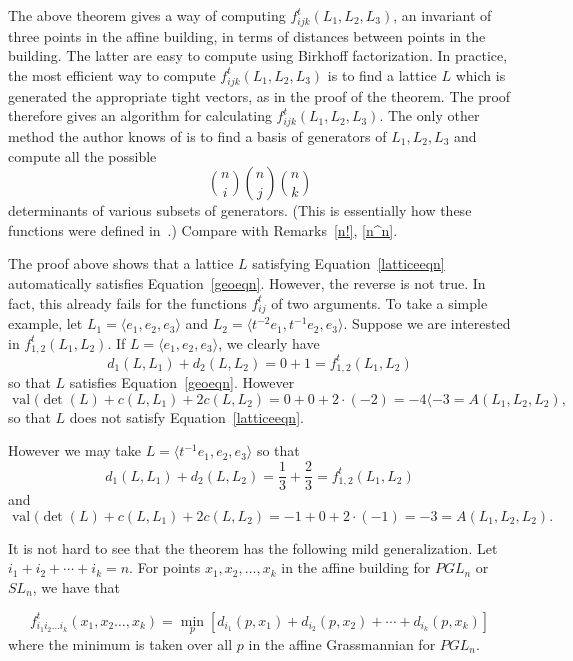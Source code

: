 \documentclass[ALCO,ThmDefs,Unicode,epreuves]{cedram}
\newcommand{\val}{\operatorname{val}}
\begin{document}
\begin{rema} The above theorem gives a way of computing $f_{ijk}^t (L_1,L_2,L_3)$, an invariant of three points in the affine building, in terms of distances between points in the building. The latter are easy to compute using Birkhoff factorization. In practice, the most efficient way to compute $f_{ijk}^t (L_1,L_2,L_3)$ is to find a lattice $L$ which is generated the appropriate tight vectors, as in the proof of the theorem. The proof therefore gives an algorithm for calculating $f_{ijk}^t (L_1,L_2,L_3)$. The only other method the author knows of is to find a basis of generators of $L_1, L_2, L_3$ and compute all the possible
\[
 \binom{n}{i} \binom{n}{j} \binom{n}{k}
\] 
determinants of various subsets of generators. (This is essentially how these functions were defined in~\cite{K}.) Compare with Remarks~\ref{n!}, \ref{n^n}.
\end{rema}

\begin{example} The proof above shows that a lattice $L$ satisfying Equation~\eqref{latticeeqn} automatically satisfies Equation~\eqref{geoeqn}. However, the reverse is not true. In fact, this already fails for the functions $f^t_{ij}$ of two arguments. To take a simple example, let $L_1=\langle e_1, e_2, e_3\rangle $ and $L_2=\langle t^{-2}e_1, t^{-1}e_2, e_3\rangle $. Suppose we are interested in $f^t_{1,2}(L_1,L_2)$. If $L=\langle e_1, e_2, e_3\rangle $, we clearly have 
\[
d_1(L,L_1) + d_2(L,L_2) = 0 + 1 = f^t_{1,2}(L_1,L_2)
\]
so that $L$ satisfies Equation~\eqref{geoeqn}. However
\[
\val(\det(L) + c(L,L_1) + 2c(L,L_2) = 0 + 0 + 2\cdot(-2) = -4 \langle -3 = A(L_1,L_2,L_2),
\]
so that $L$ does not satisfy Equation~\eqref{latticeeqn}.

However we may take $L=\langle t^{-1}e_1, e_2, e_3\rangle $ so that
\[
d_1(L,L_1) + d_2(L,L_2) = \frac{1}{3} + \frac{2}{3} = f^t_{1,2}(L_1,L_2)
\]
and 
\[
\val(\det(L) + c(L,L_1) + 2c(L,L_2) = -1 + 0 + 2\cdot(-1) = -3 = A(L_1,L_2,L_2).
\]
\end{example}


It is not hard to see that the theorem has the following mild generalization. Let $i_1+i_2+\cdots+i_k=n$. For points $x_1, x_2, \dots, x_k$ in the affine building for $PGL_n$ or $SL_n$, we have that
\begin{theorem}\label{basicfn}
\[
f_{i_1i_2\dots i_k}^t(x_1,x_2\dots,x_k)= \min_{p} [ d_{i_1}(p,x_1) + d_{i_2}(p,x_2) + \cdots + d_{i_k}(p,x_k) ]
\]
where the minimum is taken over all $p$ in the affine Grassmannian for $PGL_n$.
\end{theorem}
\end{document}
